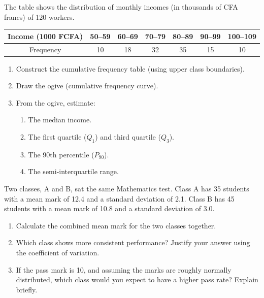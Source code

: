 \documentclass[11pt]{article}
\begin{document}
\begin{exercice}
The table shows the distribution of monthly incomes (in thousands of CFA francs) of 120 workers.

\begin{center}
\begin{tabular}{|c|c|c|c|c|c|c|}\hline
Income (1000 FCFA) & 50--59 & 60--69 & 70--79 & 80--89 & 90--99 & 100--109 \\ \hline
Frequency & 10 & 18 & 32 & 35 & 15 & 10 \\ \hline
\end{tabular}
\end{center}

\begin{enumerate}
\item Construct the cumulative frequency table (using upper class boundaries).
\item Draw the ogive (cumulative frequency curve).
\item From the ogive, estimate:
\begin{enumerate}
\item The median income.
\item The first quartile ($Q_1$) and third quartile ($Q_3$).
\item The 90th percentile ($P_{90}$).
\item The semi-interquartile range.
\end{enumerate}
\end{enumerate}
\end{exercice}

\begin{exercice}
Two classes, A and B, sat the same Mathematics test.
Class A has 35 students with a mean mark of 12.4 and a standard deviation of 2.1.
Class B has 45 students with a mean mark of 10.8 and a standard deviation of 3.0.

\begin{enumerate}
\item Calculate the combined mean mark for the two classes together.
\item Which class shows more consistent performance? Justify your answer using the coefficient of variation.
\item If the pass mark is 10, and assuming the marks are roughly normally distributed, which class would you expect to have a higher pass rate? Explain briefly.
\end{enumerate}
\end{exercice}
\end{document}
